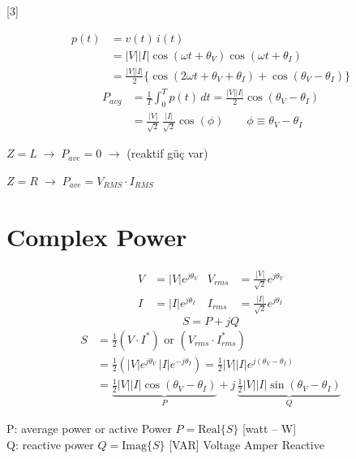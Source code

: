 \documentclass[11pt,a4paper]{article}
\begin{document}
[3]

\begin{align*}
p(t) &= v(t)\,i(t)\\
&= |V||I|\cos(\omega t+\theta_V)\cos(\omega t+\theta_I)\\
&= \frac{|V||I|}{2}\Big\{\cos(2\omega t+\theta_V+\theta_I)+\cos(\theta_V-\theta_I)\Big\}
\end{align*}
\begin{align*}
P_{avg} &= \frac{1}{T}\int_0^T p(t)\,dt = \frac{|V||I|}{2}\cos(\theta_V-\theta_I)\\
&= \frac{|V|}{\sqrt2}\,\frac{|I|}{\sqrt2}\cos(\phi) \qquad \phi \equiv \theta_V-\theta_I
\end{align*}

$Z = L \;\to\; P_{ave} = 0$ \quad $\longrightarrow$  (reaktif güç var)

$Z = R \;\to\; P_{ave} = V_{RMS}\cdot I_{RMS}$

\section{Complex Power}
\begin{align*}
V &= |V|e^{j\theta_V} & V_{rms} &= \frac{|V|}{\sqrt2}e^{j\theta_V}\\
I &= |I|e^{j\theta_I} & I_{rms} &= \frac{|I|}{\sqrt2}e^{j\theta_I}
\end{align*}
\[ S = P + jQ \]
\begin{align*}
S &= \frac12\left(V\cdot I^*\right) \text{ or } \left(V_{rms}\cdot I_{rms}^*\right)\\
&= \frac12\left(|V|e^{j\theta_V}\,|I|e^{-j\theta_I}\right) = \frac12|V||I|e^{j(\theta_V-\theta_I)}\\
&= \underbrace{\frac12|V||I|\cos(\theta_V-\theta_I)}_{P} + j\,\underbrace{\frac12|V||I|\sin(\theta_V-\theta_I)}_{Q}
\end{align*}

\noindent P: average power or active Power \quad $P = \mathrm{Real}\{S\}$ \hfill [watt -- W]\\
Q: reactive power \quad $Q = \mathrm{Imag}\{S\}$ \hfill [VAR] Voltage Amper Reactive
\end{document}
